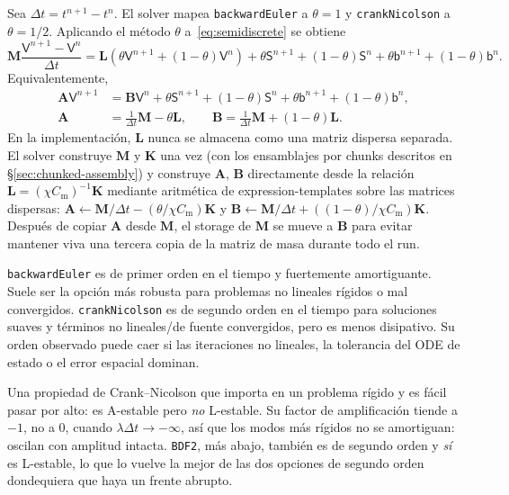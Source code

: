 \documentclass[11pt,a4paper]{article}
\newcommand{\code}[1]{\texttt{\small #1}}
\newcommand{\Mmass}{\mathbf{M}}
\newcommand{\Kstif}{\mathbf{K}}
\newcommand{\Lop}{\mathbf{L}}
\newcommand{\Aimp}{\mathbf{A}}
\newcommand{\Bimp}{\mathbf{B}}
\begin{document}
Sea $\Delta t=t^{n+1}-t^n$. El solver mapea \code{backwardEuler} a $\theta=1$ y
\code{crankNicolson} a $\theta=1/2$. Aplicando el método $\theta$ a~\eqref{eq:semidiscrete}
se obtiene
\begin{equation}
  \Mmass\frac{\mathsf{V}^{n+1}-\mathsf{V}^{n}}{\Delta t}
  =
  \Lop\left(\theta\mathsf{V}^{n+1}+(1-\theta)\mathsf{V}^{n}\right)
  +
  \theta\mathsf{S}^{n+1}
  +(1-\theta)\mathsf{S}^{n}
  +\theta\mathsf{b}^{n+1}
  +(1-\theta)\mathsf{b}^{n}.
  \label{eq:theta}
\end{equation}
Equivalentemente,
\begin{align}
  \Aimp \mathsf{V}^{n+1}
  &=
  \Bimp \mathsf{V}^{n}
  +\theta\mathsf{S}^{n+1}
  +(1-\theta)\mathsf{S}^{n}
  +\theta\mathsf{b}^{n+1}
  +(1-\theta)\mathsf{b}^{n},
  \label{eq:implicit-system}\\
  \Aimp &= \frac{1}{\Delta t}\Mmass-\theta\Lop,\qquad
  \Bimp = \frac{1}{\Delta t}\Mmass+(1-\theta)\Lop.
\end{align}
En la implementación, $\Lop$ nunca se almacena como una matriz dispersa separada. El solver
construye $\Mmass$ y $\Kstif$ una vez (con los ensamblajes por chunks descritos en
\S\ref{sec:chunked-assembly}) y construye $\Aimp$, $\Bimp$ directamente desde la relación
$\Lop=(\chi C_{\text{m}})^{-1}\Kstif$ mediante aritmética de expression-templates sobre las matrices
dispersas: $\Aimp\leftarrow\Mmass/\Delta t-(\theta/\chi C_{\text{m}})\Kstif$ y
$\Bimp\leftarrow\Mmass/\Delta t+((1-\theta)/\chi C_{\text{m}})\Kstif$. Después de copiar $\Aimp$ desde
$\Mmass$, el storage de $\Mmass$ se mueve a $\Bimp$ para evitar mantener viva una tercera
copia de la matriz de masa durante todo el run.

\code{backwardEuler} es de primer orden en el tiempo y fuertemente amortiguante. Suele ser
la opción más robusta para problemas no lineales rígidos o mal convergidos.
\code{crankNicolson} es de segundo orden en el tiempo para soluciones suaves y términos no
lineales/de fuente convergidos, pero es menos disipativo. Su orden observado puede caer si
las iteraciones no lineales, la tolerancia del ODE de estado o el error espacial dominan.

Una propiedad de Crank--Nicolson que importa en un problema rígido y es fácil pasar por
alto: es A-estable pero \emph{no} L-estable. Su factor de amplificación tiende a $-1$, no a
$0$, cuando $\lambda\Delta t\to-\infty$, así que los modos más rígidos no se amortiguan:
oscilan con amplitud intacta. \code{BDF2}, más abajo, también es de segundo orden y
\emph{sí} es L-estable, lo que lo vuelve la mejor de las dos opciones de segundo orden
dondequiera que haya un frente abrupto.
\end{document}
